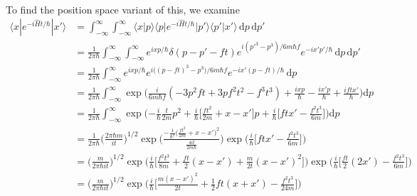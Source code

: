 \documentclass[../principles-of-quantum-mechanics.tex]{subfiles}
\begin{document}
\begin{questions}
\begin{solution}
\begin{align*}
		\end{align*}
		To find the position space variant of this, we examine
		\begin{align*}
			\langle x |e^{-i\hat{H}t/\hbar}|x'\rangle &= \int_{-\infty}^{\infty}\int_{-\infty}^{\infty}\langle x|p\rangle\langle p|e^{-i\hat{H}t/\hbar}|p'\rangle\langle p'|x'\rangle\,\mathrm{d}p\,\mathrm{d}p' \\
			&= \frac{1}{2\pi\hbar}\int_{-\infty}^{\infty}\int_{-\infty}^{\infty} e^{ixp/\hbar}\delta(p - p' - ft)e^{i(p'^3 - p^3)/6m\hbar f}e^{-ix'p'/\hbar}\,\mathrm{d}p\,\mathrm{d}p' \\
			&= \frac{1}{2\pi \hbar}\int_{-\infty}^{\infty} e^{ixp/\hbar}e^{i\big((p - ft)^3 - p^3\big)/6m\hbar f}e^{-ix'(p - ft)/\hbar}\,\mathrm{d}p \\
			&= \frac{1}{2\pi\hbar}\int_{-\infty}^{\infty}\exp\Big(\frac{i}{6m\hbar f}(-3p^2ft + 3pf^2t^2 - f^3t^3) + \frac{ixp}{\hbar} - \frac{ix'p}{\hbar} + \frac{iftx'}{\hbar}\Big)\mathrm{d}p \\
			&= \frac{1}{2\pi\hbar}\int_{-\infty}^{\infty}\exp\Big({-\frac{i}{\hbar}\frac{t}{2m}}p^2 + \frac{i}{\hbar}\Big[\frac{ft^2}{2m} + x - x'\Big]p + \frac{i}{\hbar}\Big[ftx' - \frac{f^2t^3}{6m}\Big]\Big)\mathrm{d}p \\
			&= \frac{1}{2\pi\hbar}\Big(\frac{2\pi \hbar m}{it}\Big)^{1/2}\exp\Big(\frac{-\frac{1}{\hbar^2}\Big(\frac{ft^2}{2m} + x - x'\Big)^2}{\frac{4it}{2m\hbar}}\Big)\exp\Big(\frac{i}{\hbar}\Big[ftx' - \frac{f^2t^3}{6m}\Big]\Big) \\
			&= \Big(\frac{m}{2\pi\hbar it}\Big)^{1/2}\exp\Big(\frac{i}{\hbar}\Big[\frac{f^2t^3}{8m} + \frac{ft}{2}(x - x') + \frac{m}{2t}(x - x')^2\Big]\Big)\exp\Big(\frac{i}{\hbar}\Big[\frac{ft}{2}(2x') - \frac{f^2t^3}{6m}\Big]\Big) \\
			&=  \Big(\frac{m}{2\pi\hbar it}\Big)^{1/2}\exp\Big(\frac{i}{\hbar}\Big[\frac{m(x - x')^2}{2t} + \frac{1}{2}ft(x + x') - \frac{f^2t^3}{24m}\Big]\Big)
		\end{align*}
	\end{solution}
	\end{questions}
\end{document}
